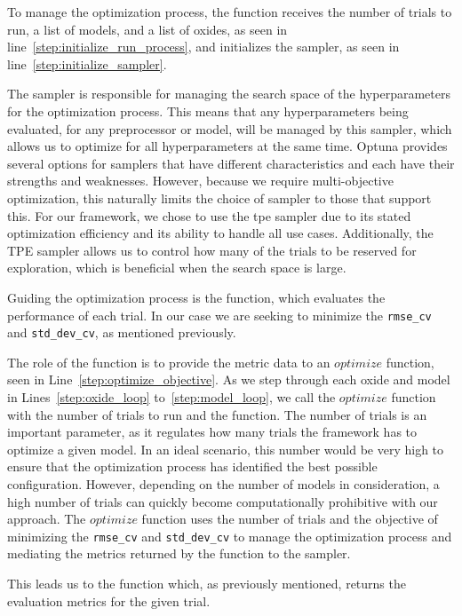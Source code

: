 To manage the optimization process, the function receives the number of trials to run, a list of models, and a list of oxides, as seen in line~\ref{step:initialize_run_process}, and initializes the sampler, as seen in line~\ref{step:initialize_sampler}.

The sampler is responsible for managing the search space of the hyperparameters for the optimization process.
This means that any hyperparameters being evaluated, for any preprocessor or model, will be managed by this sampler, which allows us to optimize for all hyperparameters at the same time.
Optuna provides several options for samplers that have different characteristics and each have their strengths and weaknesses.
However, because we require multi-objective optimization, this naturally limits the choice of sampler to those that support this.
For our framework, we chose to use the \gls{tpe} sampler due to its stated optimization efficiency and its ability to handle all use cases.
Additionally, the TPE sampler allows us to control how many of the trials to be reserved for exploration, which is beneficial when the search space is large\cite{optuna_2019}.

Guiding the optimization process is the  function, which evaluates the performance of each trial.
In our case we are seeking to minimize the \texttt{rmse\_cv} and \texttt{std\_dev\_cv}, as mentioned previously.

The role of the  function is to provide the metric data to an $optimize$ function, seen in Line~\ref{step:optimize_objective}.
As we step through each oxide and model in Lines~\ref{step:oxide_loop} to~\ref{step:model_loop}, we call the $optimize$ function with the number of trials to run and the  function.
The number of trials is an important parameter, as it regulates how many trials the framework has to optimize a given model.
In an ideal scenario, this number would be very high to ensure that the optimization process has identified the best possible configuration.
However, depending on the number of models in consideration, a high number of trials can quickly become computationally prohibitive with our approach.
The $optimize$ function uses the number of trials and the objective of minimizing the \texttt{rmse\_cv} and \texttt{std\_dev\_cv} to manage the optimization process and mediating the metrics returned by the  function to the sampler. 

This leads us to the  function which, as previously mentioned, returns the evaluation metrics for the given trial.

